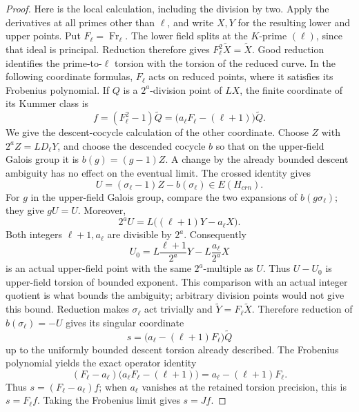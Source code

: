 \begin{proof}
Here is the local calculation, including the division by two.  Apply
the derivatives at all primes other than \(\ell\), and write \(X,Y\)
for the resulting lower and upper points.  Put \(F_\ell=\operatorname{Fr}_\ell\).
The lower field splits at the \(K\)-prime \((\ell)\), since that ideal
is principal.  Reduction therefore gives \(F_\ell^2\widetilde X=\widetilde X\).
Good reduction identifies the prime-to-\(\ell\) torsion with the
torsion of the reduced curve.  In the following coordinate formulas,
\(F_\ell\) acts on reduced points, where it satisfies its
Frobenius polynomial.  If \(Q\) is a \(2^a\)-division point
of \(LX\), the finite coordinate
of its Kummer class is
\begin{equation}
 f=(F_\ell^2-1)\widetilde Q=
       \bigl(a_\ell F_\ell-(\ell+1)\bigr)\widetilde Q.
 \label{rd:finite-formula}
\end{equation}
We give the descent-cocycle calculation of the other coordinate.
Choose \(Z\) with \(2^aZ=LD_\ell Y\), and choose the descended
cocycle \(b\) so that on the upper-field Galois group it is
\(b(g)=(g-1)Z\).  A change by the already bounded descent ambiguity
has no effect on the eventual limit.  The crossed identity gives
\[
 U=(\sigma_\ell-1)Z-b(\sigma_\ell)
                  \in E(H_{crn}).
 \]
For \(g\) in the upper-field Galois group, compare the two
expansions of \(b(g\sigma_\ell)\); they give \(gU=U\).
Moreover,
\[
 2^aU=L\bigl((\ell+1)Y-a_\ell X\bigr).
 \]
Both integers \(\ell+1,a_\ell\) are divisible by \(2^a\).
Consequently
\[
 U_0=L\frac{\ell+1}{2^a}Y-
                      L\frac{a_\ell}{2^a}X
 \]
is an actual upper-field point with the same \(2^a\)-multiple
as \(U\).  Thus \(U-U_0\) is upper-field torsion of bounded
exponent.  This comparison with an actual integer quotient
is what bounds the ambiguity; arbitrary division points
would not give this bound.  Reduction makes
\(\sigma_\ell\) act trivially and
\(\widetilde Y=F_\ell\widetilde X\).  Therefore
reduction of \(b(\sigma_\ell)=-U\) gives its singular coordinate
\begin{equation}
 s=\bigl(a_\ell-(\ell+1)F_\ell\bigr)\widetilde Q
 \label{rd:singular-formula}
\end{equation}
up to the uniformly bounded descent torsion already described.
The Frobenius polynomial yields the exact operator identity
\begin{equation}
 (F_\ell-a_\ell)
     \bigl(a_\ell F_\ell-(\ell+1)\bigr)
       =a_\ell-(\ell+1)F_\ell.
 \label{rd:exact-frobenius}
\end{equation}
Thus \(s=(F_\ell-a_\ell)f\); when \(a_\ell\) vanishes at the
retained torsion precision, this is \(s=F_\ell f\).  Taking the
Frobenius limit gives \(s=Jf\).


\end{proof}
